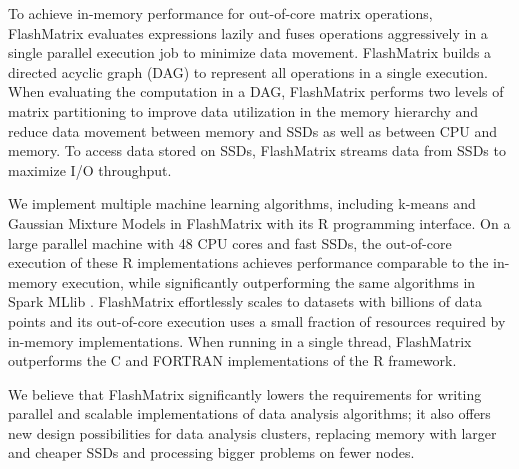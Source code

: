 To achieve in-memory performance for out-of-core matrix operations,
FlashMatrix evaluates expressions lazily and fuses operations aggressively
in a single parallel execution job to minimize data movement.
FlashMatrix builds a directed acyclic graph (DAG) to represent all operations
in a single execution. When evaluating the computation in a DAG, FlashMatrix
performs two levels of matrix partitioning to improve data utilization in
the memory hierarchy and reduce data movement between memory and SSDs
as well as between CPU and memory.
To access data stored on SSDs, FlashMatrix
streams data from SSDs to maximize I/O throughput.  



We implement multiple machine learning algorithms, including k-means \cite{kmeans}
and Gaussian Mixture Models \cite{gmm} in FlashMatrix with its R programming
interface. On a large parallel machine with 48
CPU cores and fast SSDs, the out-of-core execution of these R implementations
achieves performance comparable to the in-memory execution,
while significantly outperforming the same algorithms in Spark MLlib
\cite{spark}. FlashMatrix effortlessly scales to datasets with billions
of data points and its out-of-core execution uses a small fraction of
resources required by in-memory implementations. 
When running in a single thread, FlashMatrix 
outperforms the C and FORTRAN implementations of the R framework.

We believe that FlashMatrix significantly lowers the requirements for writing parallel
and scalable implementations of data analysis algorithms; it also offers new
design possibilities for data analysis clusters, replacing memory with larger
and cheaper SSDs and processing bigger problems on fewer nodes.

